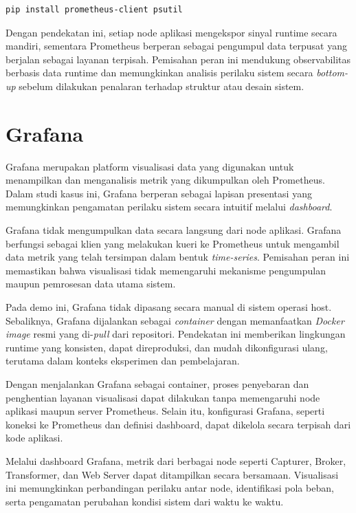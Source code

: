 \begin{lstlisting}[language=bash, caption={Memasang dependensi Python}, label={lst:ch02-1}]
pip install prometheus-client psutil
\end{lstlisting}

Dengan pendekatan ini, setiap node aplikasi mengekspor sinyal runtime secara mandiri, sementara Prometheus berperan sebagai pengumpul data terpusat yang berjalan sebagai layanan terpisah. Pemisahan peran ini mendukung observabilitas berbasis data runtime dan memungkinkan analisis perilaku sistem secara \emph{bottom-up} sebelum dilakukan penalaran terhadap struktur atau desain sistem.



\section{Grafana}

Grafana merupakan platform visualisasi data yang digunakan untuk menampilkan dan menganalisis metrik yang dikumpulkan oleh Prometheus. Dalam studi kasus ini, Grafana berperan sebagai lapisan presentasi yang memungkinkan pengamatan perilaku sistem secara intuitif melalui \emph{dashboard}.

Grafana tidak mengumpulkan data secara langsung dari node aplikasi. Grafana berfungsi sebagai klien yang melakukan kueri ke Prometheus untuk mengambil data metrik yang telah tersimpan dalam bentuk \emph{time-series}. Pemisahan peran ini memastikan bahwa visualisasi tidak memengaruhi mekanisme pengumpulan maupun pemrosesan data utama sistem.

Pada demo ini, Grafana tidak dipasang secara manual di sistem operasi host. Sebaliknya, Grafana dijalankan sebagai \emph{container} dengan memanfaatkan \emph{Docker image} resmi yang di-\emph{pull} dari repositori. Pendekatan ini memberikan lingkungan runtime yang konsisten, dapat direproduksi, dan mudah dikonfigurasi ulang, terutama dalam konteks eksperimen dan pembelajaran.

Dengan menjalankan Grafana sebagai container, proses penyebaran dan penghentian layanan visualisasi dapat dilakukan tanpa memengaruhi node aplikasi maupun server Prometheus. Selain itu, konfigurasi Grafana, seperti koneksi ke Prometheus dan definisi dashboard, dapat dikelola secara terpisah dari kode aplikasi.

Melalui dashboard Grafana, metrik dari berbagai node seperti Capturer, Broker, Transformer, dan Web Server dapat ditampilkan secara bersamaan. Visualisasi ini memungkinkan perbandingan perilaku antar node, identifikasi pola beban, serta pengamatan perubahan kondisi sistem dari waktu ke waktu.


